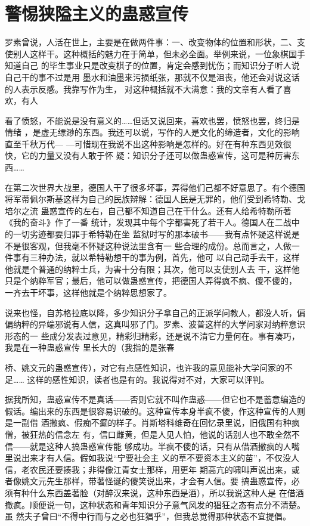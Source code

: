 \chapter{警惕狭隘主义的蛊惑宣传}

罗素曾说，人活在世上，主要是在做两件事：一、改变物体的位置和形状，二、支 使别人这样干。这种概括的魅力在于简单，但未必全面。举例来说，一位象棋国手知道自己 的毕生事业只是改变棋子的位置，肯定会感到忧伤；而知识分子听人说自己干的事不过是用 墨水和油墨来污损纸张，那就不仅是沮丧，他还会对说这话的人表示反感。我靠写作为生， 对这种概括就不大满意：我的文章有人看了喜欢，有人 

看了愤怒，不能说是没有意义的……但话又说回来，喜欢也罢，愤怒也罢，终归是情绪 ，是虚无缥渺的东西。我还可以说，写作的人是文化的缔造者，文化的影响直至千秋万代— —可惜现在我说不出这种影响是怎样的。好在有种东西见效很快，它的力量又没有人敢于怀 疑：知识分子还可以做蛊惑宣传，这可是种厉害东西…… 

在第二次世界大战里，德国人干了很多坏事，弄得他们己都不好意思了。有个德国 将军蒂佩尔斯基这样为自己的民族辩解：德国人民是无罪的，他们受到希特勒、戈培尔之流 蛊惑宣传的左右，自己都不知道自己在干什么。还有人给希特勒所著《我的奋斗》作了一番 统计，发现其中每个字都害死了若干人。德国人在二战中的一切劣迹都要归罪于希特勒在坐 监狱时写的那本破书——我有点怀疑这样说是不是很客观，但我毫不怀疑这种说法里含有一 些合理的成份。总而言之，人做一件事有三种办法，就以希特勒想干的事为例，首先，他可 以自己动手去干，这样他就是个普通的纳粹士兵，为害十分有限；其次，他可以支使别人去 干，这样他只是个纳粹军官；最后，他可以做蛊惑宣传，把德国人弄得疯不疯、傻不傻的， 一齐去干坏事，这样他就是个纳粹思想家了。 

说来也怪，自苏格拉底以降，多少知识分子拿自己的正派学问教人，都没人听，偏 偏纳粹的异端邪说有人信，这真叫邪了门。罗素、波普这样的大学问家对纳粹意识形态的一 些成分发表过意见，精彩归精彩，还是说不清它力量何在。事有凑巧，我是在一种蛊惑宣传 里长大的（我指的是张春 

桥、姚文元的蛊惑宣传），对它有点感性知识，也许我的意见能补大学问家的不足…… 这样的感性知识，读者也是有的。我说得对不对，大家可以评判。 


据我所知，蛊惑宣传不是真话——否则它就不叫作蛊惑——但它也不是蓄意编造的 假话。编出来的东西是很容易识破的。这种宣传本身半疯不傻，作这种宣传的人则是一副借 酒撒疯、假痴不癫的样子。肖斯塔科维奇在回忆录里说，旧俄国有种疯僧，被狂热的信念左 有，信口雌黄，但是人见人怕，他说的话别人也不敢全然不信——就是这种人搞蛊惑宣传能 够成功。半疯不傻的话，只有从借酒撤疯的人嘴里说出来才有人信。假如我说“宁要社会主 义的草不要资本主义的苗”，不仅没人信，老农民还要揍我；非得像江青女士那样，用更年 期高亢的啸叫声说出来，或者像姚文元先生那样，带著怪诞的傻笑说出来，才会有人信。要 搞蛊惑宣传，必须有种什么东西盖著脸（对醉汉来说，这种东西是酒），所以我说这种人是 在借酒撤疯。顺便说一句，这种状态和青年知识分子意气风发的猖狂之态有点分不清楚。虽 然夫子曾曰“不得中行而与之必也狂猖乎”，但我总觉得那种状态不宜提倡。 


